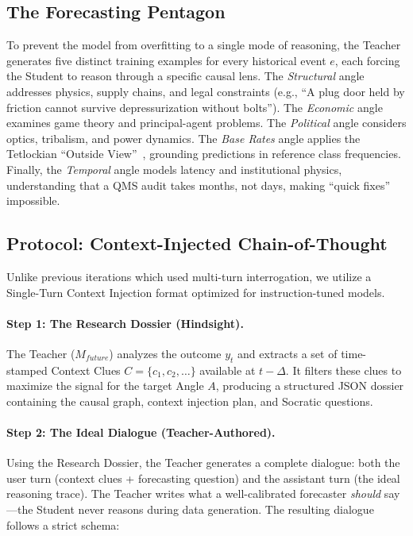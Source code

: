 \documentclass[11pt,a4paper]{article}
\begin{document}
\subsection{The Forecasting Pentagon}
\label{sec:pentagon}

To prevent the model from overfitting to a single mode of reasoning, the Teacher generates five distinct training examples for every historical event $e$, each forcing the Student to reason through a specific causal lens. The \textit{Structural} angle addresses physics, supply chains, and legal constraints (e.g., ``A plug door held by friction cannot survive depressurization without bolts''). The \textit{Economic} angle examines game theory and principal-agent problems. The \textit{Political} angle considers optics, tribalism, and power dynamics. The \textit{Base Rates} angle applies the Tetlockian ``Outside View''~\cite{tetlock_superforecasting}, grounding predictions in reference class frequencies. Finally, the \textit{Temporal} angle models latency and institutional physics, understanding that a QMS audit takes months, not days, making ``quick fixes'' impossible.

\subsection{Protocol: Context-Injected Chain-of-Thought}
\label{sec:protocol}

Unlike previous iterations which used multi-turn interrogation, we utilize a Single-Turn Context Injection format optimized for instruction-tuned models.

\paragraph{Step 1: The Research Dossier (Hindsight).}
The Teacher ($M_{future}$) analyzes the outcome $y_t$ and extracts a set of time-stamped Context Clues $C = \{c_1, c_2, \ldots\}$ available at $t-\Delta$. It filters these clues to maximize the signal for the target Angle $A$, producing a structured JSON dossier containing the causal graph, context injection plan, and Socratic questions.

\paragraph{Step 2: The Ideal Dialogue (Teacher-Authored).}
Using the Research Dossier, the Teacher generates a complete dialogue: both the user turn (context clues + forecasting question) and the assistant turn (the ideal reasoning trace). The Teacher writes what a well-calibrated forecaster \textit{should} say---the Student never reasons during data generation. The resulting dialogue follows a strict schema:
\end{document}
